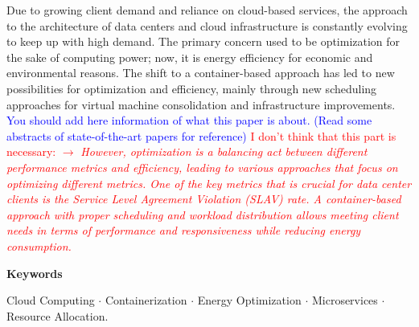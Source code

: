 Due to growing client demand and reliance on cloud-based services, the approach to the architecture of data centers and cloud infrastructure is constantly evolving to keep up with high demand. The primary concern used to be optimization for the sake of computing power; now, it is energy efficiency for economic and environmental reasons. The shift to a container-based approach has led to new possibilities for optimization and efficiency, mainly through new scheduling approaches for virtual machine consolidation and infrastructure improvements. \textcolor{blue}{You should add here information of what this paper is about. (Read some abstracts of state-of-the-art papers for reference)}
\textcolor{red}{I don't think that this part is necessary: $\rightarrow$ \textit{However, optimization is a balancing act between different performance metrics and efficiency, leading to various approaches that focus on optimizing different metrics. One of the key metrics that is crucial for data center clients is the Service Level Agreement Violation (SLAV) rate. A container-based approach with proper scheduling and workload distribution allows meeting client needs in terms of performance and responsiveness while reducing energy consumption.}}

\textbf{Keywords} 
    
Cloud Computing $\cdot$ Containerization $\cdot$ Energy Optimization $\cdot$ Microservices $\cdot$ Resource Allocation.
